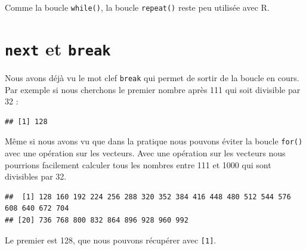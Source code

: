 \documentclass[
]{book}
\newenvironment{Shaded}{\begin{snugshade}}{\end{snugshade}}
\newcommand{\ControlFlowTok}[1]{\textcolor[rgb]{0.13,0.29,0.53}{\textbf{#1}}}
\newcommand{\DecValTok}[1]{\textcolor[rgb]{0.00,0.00,0.81}{#1}}
\newcommand{\KeywordTok}[1]{\textcolor[rgb]{0.13,0.29,0.53}{\textbf{#1}}}
\newcommand{\NormalTok}[1]{#1}
\newcommand{\OperatorTok}[1]{\textcolor[rgb]{0.81,0.36,0.00}{\textbf{#1}}}
\newcommand{\StringTok}[1]{\textcolor[rgb]{0.31,0.60,0.02}{#1}}
\begin{document}
Comme la boucle \texttt{while()}, la boucle \texttt{repeat()} reste peu utilisée avec R.

\hypertarget{l17spe}{%
\section{\texorpdfstring{\texttt{next} et \texttt{break}}{next et break}}\label{l17spe}}

Nous avons déjà vu le mot clef \texttt{break} qui permet de sortir de la boucle en cours. Par exemple si nous cherchons le premier nombre après 111 qui soit divisible par 32 :

\begin{Shaded}
\end{Shaded}

\begin{verbatim}
## [1] 128
\end{verbatim}

Même si nous avons vu que dans la pratique nous pouvons éviter la boucle \texttt{for()} avec une opération sur les vecteurs. Avec une opération sur les vecteurs nous pourrions facilement calculer tous les nombres entre 111 et 1000 qui sont divisibles par 32.

\begin{Shaded}
\end{Shaded}

\begin{verbatim}
##  [1] 128 160 192 224 256 288 320 352 384 416 448 480 512 544 576 608 640 672 704
## [20] 736 768 800 832 864 896 928 960 992
\end{verbatim}

Le premier est 128, que nous pouvons récupérer avec \texttt{{[}1{]}}.
\end{document}

